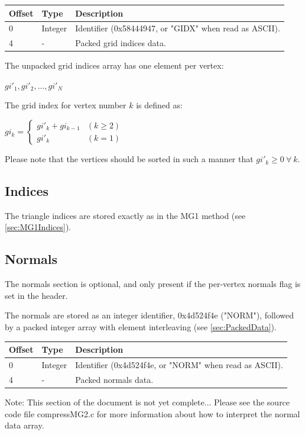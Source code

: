 \begin{tabular}{|l|l|l|}\hline
\textbf{Offset} &  \textbf{Type} & \textbf{Description}\\ \hline
0 & Integer & Identifier (0x58444947, or "GIDX" when read as ASCII).\\ \hline
4 & - & Packed grid indices data.\\ \hline
\end{tabular}

The unpacked grid indices array has one element per vertex:

$gi'_1, gi'_2, ..., gi'_N$

The grid index for vertex number $k$ is defined as:

$gi_k = \begin{cases}
gi'_k + gi_{k-1} & (k \geq 2)\\
gi'_k & (k = 1)
\end{cases}$

Please note that the vertices should be sorted in such a manner that $gi'_k \geq 0 \: \forall \: k$.


\subsection{Indices}
The triangle indices are stored exactly as in the MG1 method (see \ref{sec:MG1Indices}).

\subsection{Normals}
The normals section is optional, and only present if the per-vertex normals
flag is set in the header.

The normals are stored as an integer identifier, 0x4d524f4e ("NORM"), followed
by a packed integer array with element interleaving (see \ref{sec:PackedData}).

\begin{tabular}{|l|l|l|}\hline
\textbf{Offset} &  \textbf{Type} & \textbf{Description}\\ \hline
0 & Integer & Identifier (0x4d524f4e, or "NORM" when read as ASCII).\\ \hline
4 & - & Packed normals data.\\ \hline
\end{tabular}

Note: This section of the document is not yet complete... Please see the source
code file compressMG2.c for more information about how to interpret the
normal data array.



